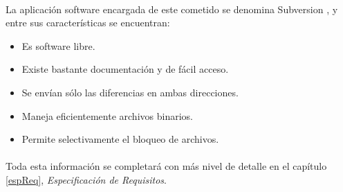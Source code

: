    \paragraph{}La aplicación software encargada de este cometido se denomina
   Subversion \cite{subversion}, y entre sus características se encuentran:
   \begin{itemize}
      \item Es software libre.
      \item Existe bastante documentación y de fácil acceso.
      \item Se envían sólo las diferencias en ambas direcciones.
      \item Maneja eficientemente archivos binarios.
      \item Permite selectivamente el bloqueo de archivos.
   \end{itemize}

\paragraph{}Toda esta información se completará con más nivel de detalle en el
capítulo \ref{espReq}, \textit{Especificación de Requisitos}.

